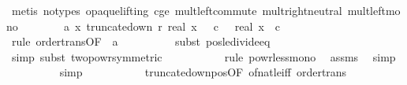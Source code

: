 \begin{isabellebody}
\ {\isacharparenleft}{\kern0pt}metis\ {\isacharparenleft}{\kern0pt}no{\isacharunderscore}{\kern0pt}types{\isacharcomma}{\kern0pt}\ opaque{\isacharunderscore}{\kern0pt}lifting{\isacharparenright}{\kern0pt}\ c{\isacharunderscore}{\kern0pt}ge{\isacharunderscore}{\kern0pt}{}\ mult{\isachardot}{\kern0pt}left{\isacharunderscore}{\kern0pt}commute\ mult{\isachardot}{\kern0pt}right{\isacharunderscore}{\kern0pt}neutral\ mult{\isacharunderscore}{\kern0pt}left{\isacharunderscore}{\kern0pt}mono{\isacharparenright}{\kern0pt}\isanewline
\isanewline
\ \ \ \ \ \ \isamarkupfalse%
\ a{\isacharunderscore}{\kern0pt}{}{\isacharcolon}{\kern0pt}\ {\isachardoublequoteopen}{\isasymAnd}x{\isachardot}{\kern0pt}\ truncate{\isacharunderscore}{\kern0pt}down\ r\ {\isacharparenleft}{\kern0pt}real\ x{\isacharparenright}{\kern0pt}\ {\isasymle}\ \ c\ \ {\isasymLongrightarrow}\ real\ x\ {\isasymle}\ c\ {\isacharasterisk}{\kern0pt}\ {}{\isachardoublequoteclose}\isanewline
\ \ \ \ \ \ \ \ \isamarkupfalse%
\ {\isacharparenleft}{\kern0pt}rule\ order{\isacharunderscore}{\kern0pt}trans{\isacharbrackleft}{\kern0pt}OF\ {\isacharunderscore}{\kern0pt}\ a{\isacharunderscore}{\kern0pt}{}{\isacharbrackright}{\kern0pt}{\isacharparenright}{\kern0pt}\isanewline
\ \ \ \ \ \ \ \ \isamarkupfalse%
\ {\isacharparenleft}{\kern0pt}subst\ pos{\isacharunderscore}{\kern0pt}le{\isacharunderscore}{\kern0pt}divide{\isacharunderscore}{\kern0pt}eq{\isacharparenright}{\kern0pt}\isanewline
\ \ \ \ \ \ \ \ \ \isamarkupfalse%
\ {\isacharparenleft}{\kern0pt}simp{\isacharcomma}{\kern0pt}\ subst\ two{\isacharunderscore}{\kern0pt}powr{\isacharunderscore}{\kern0pt}{}{\isacharbrackleft}{\kern0pt}symmetric{\isacharbrackright}{\kern0pt}{\isacharparenright}{\kern0pt}\isanewline
\ \ \ \ \ \ \ \ \ \isamarkupfalse%
\ {\isacharparenleft}{\kern0pt}rule\ powr{\isacharunderscore}{\kern0pt}less{\isacharunderscore}{\kern0pt}mono{\isacharparenright}{\kern0pt}\ \isamarkupfalse%
\ assms{\isacharparenleft}{\kern0pt}{}{\isacharparenright}{\kern0pt}\ \isamarkupfalse%
\ simp\isanewline
\ \ \ \ \ \ \ \ \isamarkupfalse%
\ simp\isanewline
\ \ \ \ \ \ \ \ \isamarkupfalse%
\ \ truncate{\isacharunderscore}{\kern0pt}down{\isacharunderscore}{\kern0pt}pos{\isacharbrackleft}{\kern0pt}OF\ of{\isacharunderscore}{\kern0pt}nat{\isacharunderscore}{\kern0pt}{}{\isacharunderscore}{\kern0pt}le{\isacharunderscore}{\kern0pt}iff{\isacharbrackright}{\kern0pt}\ order{\isacharunderscore}{\kern0pt}trans\ \isamarkupfalse%

\end{isabellebody}
